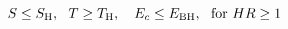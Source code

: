 \begin{equation}
 \label{2eq6}
 S \le S_{\rm H},~~ T \ge T_{\rm H},~~~E_c \le E_{\rm BH}, ~~{\rm for}~ HR \ge 1
 \end{equation}


